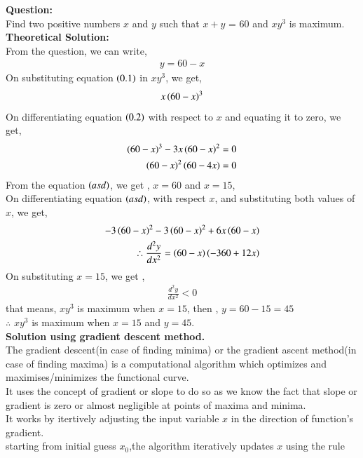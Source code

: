 \documentclass[journal]{IEEEtran}
\begin{document}
\textbf{Question:}
\\
Find two positive numbers $x$ and $y$ such that $x + y$ = 60 and $xy^3$ is maximum.
\\
\textbf{ Theoretical Solution: }
\\
From the question, we can write,
\begin{align}
        y = 60 - x
\end{align}
On substituting equation $\left(0.1\right)$ in $xy^3$, we get,
\begin{align}
    x\left(60 - x\right)^3
\end{align}
On differentiating equation $\left(0.2\right)$ with respect to $x$ and equating it to zero, we get,
\begin{align}
    \left(60 - x\right)^3 - 3x\left(60 - x\right)^2 = 0\\
    \left(60 - x\right)^2\left(60 - 4x\right) = 0
\end{align}
From the equation $\left(asd\right)$, we get , $x = 60$ and $x = 15$,\\
On differentiating equation $\left(asd\right)$, with respect $x$, and substituting both values of $x$, we get,
\begin{align}
    -3\left(60 - x\right)^2 -3\left(60 - x\right)^2 + 6x\left(60 - x\right)\\
    \therefore \frac{d^2y}{dx^2} = \left(60 - x\right)\left(-360 + 12x\right)
\end{align}
On substituting $x = 15$, we get ,
\begin{align}
    \frac{d^2y}{dx^2} < 0 
\end{align}
that means, $xy^3$ is maximum when $x = 15$, then , $y = 60 - 15=45$\\
$\therefore$ $xy^3$ is maximum when $x = 15$ and $ y = 45$.\\
\textbf{Solution using gradient descent method.}
\\
The gradient descent(in case of finding minima) or the gradient ascent method(in case of finding maxima) is a computational algorithm which optimizes and maximises/minimizes the functional curve.\\
It uses the concept of gradient or slope to do so as we know the fact that slope or gradient is zero or almost negligible at points of maxima and minima.\\
It works by itertively adjusting the input variable $x$ in the direction of function's gradient.\\
starting from initial guess $x_0$,the algorithm iteratively updates $x$ using the rule\\
\end{document}
